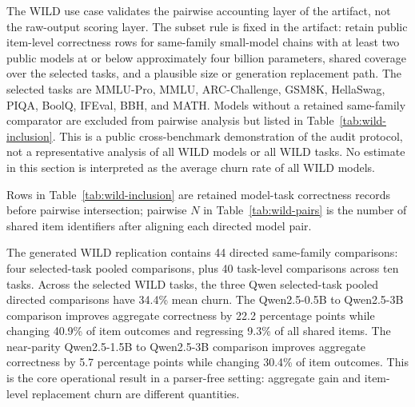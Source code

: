 \documentclass[manuscript, screen, review, nonacm]{jair}
\begin{document}
The WILD use case validates the pairwise accounting layer of the artifact, not the raw-output scoring layer. The subset rule is fixed in the artifact: retain public item-level correctness rows for same-family small-model chains with at least two public models at or below approximately four billion parameters, shared coverage over the selected tasks, and a plausible size or generation replacement path. The selected tasks are MMLU-Pro, MMLU, ARC-Challenge, GSM8K, HellaSwag, PIQA, BoolQ, IFEval, BBH, and MATH. Models without a retained same-family comparator are excluded from pairwise analysis but listed in Table~\ref{tab:wild-inclusion}. This is a public cross-benchmark demonstration of the audit protocol, not a representative analysis of all WILD models or all WILD tasks. No estimate in this section is interpreted as the average churn rate of all WILD models.

\begin{table}[t]
\centering
\scriptsize
\resizebox{\linewidth}{!}{}
\caption{WILD inclusion coverage for public models at approximately four billion parameters or below. The table reports selected-task rows available under the artifact extraction rule and the reason each model was retained or excluded from the paired-family demonstration. The complete machine-generated inclusion and exclusion files are included in the public release.}
\label{tab:wild-inclusion}
\end{table}

Rows in Table~\ref{tab:wild-inclusion} are retained model-task correctness records before pairwise intersection; pairwise $N$ in Table~\ref{tab:wild-pairs} is the number of shared item identifiers after aligning each directed model pair.

\begin{table}[t]
\centering
\small

\caption{Public WILD correctness-only demonstration.}
\label{tab:wild-summary}
\end{table}

The generated WILD replication contains 44 directed same-family comparisons: four selected-task pooled comparisons, plus 40 task-level comparisons across ten tasks. Across the selected WILD tasks, the three Qwen selected-task pooled directed comparisons have 34.4\% mean churn. The Qwen2.5-0.5B to Qwen2.5-3B comparison improves aggregate correctness by 22.2 percentage points while changing 40.9\% of item outcomes and regressing 9.3\% of all shared items. The near-parity Qwen2.5-1.5B to Qwen2.5-3B comparison improves aggregate correctness by 5.7 percentage points while changing 30.4\% of item outcomes. This is the core operational result in a parser-free setting: aggregate gain and item-level replacement churn are different quantities.
\end{document}
